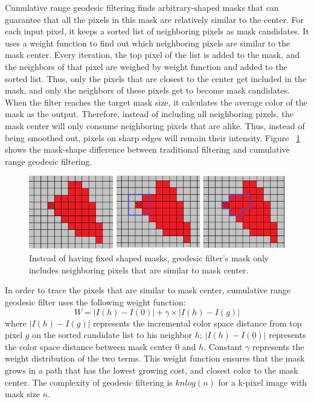 Cumulative range geodesic filtering \cite{David:geo} finds arbitrary-shaped masks that can guarantee that all the pixels in this mask are relatively similar to the center. For each input pixel, it keeps a sorted list of neighboring pixels as mask candidates. It uses a weight function to find out which neighboring pixels are similar to the mask center. Every iteration, the top pixel of the list is added to the mask, and the neighbors of that pixel are weighed by weight function and added to the sorted list. Thus, only the pixels that are closest to the center get included in the mask, and only the neighbors of these pixels get to become mask candidates. When the filter reaches the target mask size, it calculates the average color of the mask as the output. Therefore, instead of including all neighboring pixels, the mask center will only consume neighboring pixels that are alike. Thus, instead of being smoothed out, pixels on sharp edges will remain their intensity. Figure ~\ref{fig:geodesicExplanation} shows the mask-shape difference between traditional filtering and cumulative range geodesic filtering.
\begin{figure}[htbp]
\includegraphics[width=1.0\textwidth]{f4}
\caption{Instead of having fixed shaped masks, geodesic filter's mask only includes neighboring pixels that are similar to mask center.}
\label{fig:geodesicExplanation}
\end{figure}

In order to trace the pixels that are similar to mask center, cumulative range geodesic filter uses the following weight function: 
\begin{equation}\label{CRGeoEquation}
W = |I(h)-I(0)| + \gamma \times |I(h)-I(g)|
\end{equation}
where $|I(h)-I(g)|$ represents the incremental color space distance from top pixel $g$ on the sorted candidate list to his neighbor $h$; $|I(h)-I(0)|$ represents the color space distance between mask center $0$ and $h$. Constant $\gamma$  represents the weight distribution of the two terms. This weight function ensures that the mask grows in a path that has the lowest growing cost, and closest color to the mask center. 
The complexity of geodesic filtering is $knlog(n)$ for a k-pixel image with mask size $n$. 

